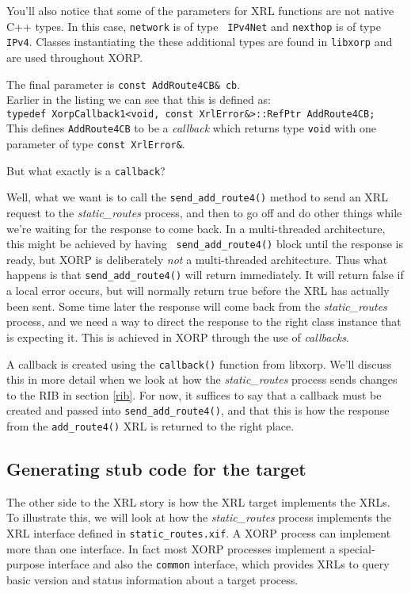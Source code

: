 \documentclass[11pt]{article}
\newcommand{\stt}{\tt\small}
\newcommand{\SRI}{{\it static\_routes}\xspace}
\begin{document}
You'll also notice that some of the parameters for XRL functions are
not native C++ types.  In this case, {\stt network} is of type {\stt
IPv4Net} and {\stt nexthop} is of type {\stt IPv4}.  Classes
instantiating the these additional types are found in {\stt libxorp}
and are used throughout XORP.  

The final parameter is {\stt const AddRoute4CB\& cb}.\\
Earlier in the
listing we can see that this is defined as:\\
{\stt typedef XorpCallback1<void, const XrlError\&>::RefPtr
  AddRoute4CB;}\\
This defines {\stt AddRoute4CB} to be a {\it callback} which returns type
{\stt void} with one parameter of type {\stt const XrlError\&}.

But what exactly is a {\stt callback}?

Well, what we want is to call the {\stt send\_add\_route4()} method to
send an XRL request to the \SRI process, and then to go off and do
other things while we're waiting for the response to come back.  In a
multi-threaded architecture, this might be achieved by having {\stt
send\_add\_route4()} block until the response is ready, but XORP is
deliberately {\it not} a multi-threaded architecture. Thus what
happens is that {\stt send\_add\_route4()} will return immediately.
It will return false if a local error occurs, but will normally return
true before the XRL has actually been sent.  Some time later the
response will come back from the \SRI process, and we need a way to
direct the response to the right class instance that is expecting it.
This is achieved in XORP through the use of {\it callbacks}.

A callback is created using the {\stt callback()} function from
libxorp.  We'll discuss this in more detail when we look at how the
\SRI process sends changes to the RIB in section \ref{rib}.  For now,
it suffices to say that a callback must be created and passed into
{\stt send\_add\_route4()}, and that this is how the response from the
{\stt add\_route4()} XRL is returned to the right place.

\newpage
\subsection{Generating stub code for the target}

The other side to the XRL story is how the XRL target implements the
XRLs.  To illustrate this, we will look at how the \SRI process
implements the XRL interface defined in {\stt static\_routes.xif}.
A XORP process can implement more than one interface.  In fact most
XORP processes implement a special-purpose interface and also the
{\stt common} interface, which provides XRLs to query basic version
and status information about a target process.
\end{document}
